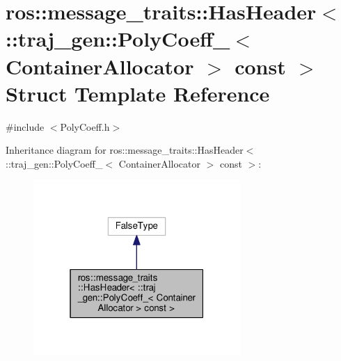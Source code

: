 \hypertarget{structros_1_1message__traits_1_1_has_header_3_01_1_1traj__gen_1_1_poly_coeff___3_01_container_allocator_01_4_01const_01_01_4}{}\section{ros\+:\+:message\+\_\+traits\+:\+:Has\+Header$<$ \+:\+:traj\+\_\+gen\+:\+:Poly\+Coeff\+\_\+$<$ Container\+Allocator $>$ const $>$ Struct Template Reference}
\label{structros_1_1message__traits_1_1_has_header_3_01_1_1traj__gen_1_1_poly_coeff___3_01_container_allocator_01_4_01const_01_01_4}


{\ttfamily \#include $<$Poly\+Coeff.\+h$>$}



Inheritance diagram for ros\+:\+:message\+\_\+traits\+:\+:Has\+Header$<$ \+:\+:traj\+\_\+gen\+:\+:Poly\+Coeff\+\_\+$<$ Container\+Allocator $>$ const $>$\+:
\nopagebreak
\begin{figure}[H]
\begin{center}
\leavevmode
\includegraphics[width=223pt]{structros_1_1message__traits_1_1_has_header_3_01_1_1traj__gen_1_1_poly_coeff___3_01_container_al4a84c6fd39d6aaf2a154b726c28db8e0}
\end{center}
\end{figure}


